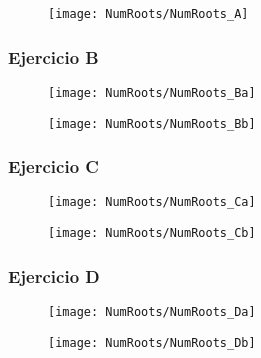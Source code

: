 \begin{figure}[H]
    \texttt{[image: NumRoots/NumRoots\_A]}
    \centering
\end{figure}

\subsubsection{Ejercicio B}

\begin{figure}[H]
    \texttt{[image: NumRoots/NumRoots\_Ba]}
    \centering
\end{figure}

\begin{figure}[H]
    \texttt{[image: NumRoots/NumRoots\_Bb]}
    \centering
\end{figure}

\subsubsection{Ejercicio C}

\begin{figure}[H]
    \texttt{[image: NumRoots/NumRoots\_Ca]}
    \centering
\end{figure}

\begin{figure}[H]
    \texttt{[image: NumRoots/NumRoots\_Cb]}
    \centering
\end{figure}

\subsubsection{Ejercicio D}

\begin{figure}[H]
    \texttt{[image: NumRoots/NumRoots\_Da]}
    \centering
\end{figure}

\begin{figure}[H]
    \texttt{[image: NumRoots/NumRoots\_Db]}
    \centering
\end{figure}